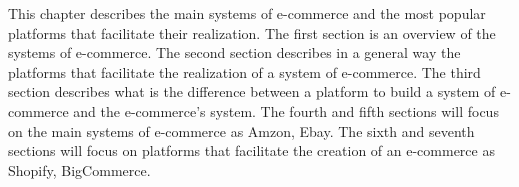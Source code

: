 This chapter describes the main systems of e-commerce and the most popular platforms that facilitate their realization.
The first section is an overview of the systems of e-commerce. The second section describes in a general way the platforms that facilitate the realization of a system of e-commerce. The third section describes what is the difference between a platform to build a system of e-commerce and the e-commerce's system. The fourth and fifth sections will focus on the main systems of e-commerce as Amzon, Ebay. The sixth and seventh sections will focus on platforms that facilitate the creation of an e-commerce as Shopify, BigCommerce.